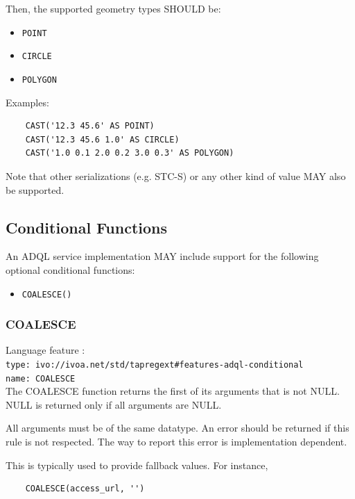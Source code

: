 \documentclass[11pt,a4paper]{ivoa}
\begin{document}
Then, the supported geometry types SHOULD be:

\begin{itemize}
    \item \verb:POINT:
    \item \verb:CIRCLE:
    \item \verb:POLYGON:
\end{itemize}

Examples:

\begin{verbatim}
    CAST('12.3 45.6' AS POINT)
    CAST('12.3 45.6 1.0' AS CIRCLE)
    CAST('1.0 0.1 2.0 0.2 3.0 0.3' AS POLYGON)
\end{verbatim}

Note that other serializations (e.g. STC-S) or any other kind of value MAY also
be supported.

\subsection{Conditional Functions}
\label{sec:condfunc}

An ADQL service implementation MAY include support for the following optional
conditional functions:

\begin{itemize}
    \item \verb:COALESCE():
\end{itemize}

\subsubsection{COALESCE}
{\footnotesize Language feature :}\\
{\footnotesize \verb|type: ivo://ivoa.net/std/tapregext#features-adql-conditional|}\\
{\footnotesize \verb|name: COALESCE|}\\

The COALESCE function returns the first of its arguments that is not
NULL. NULL is returned only if all arguments are NULL.

All arguments must be of the same datatype. An error should be returned
if this rule is not respected. The way to report this error is
implementation dependent.

This is typically used to provide fallback values. For instance,

\begin{verbatim}
    COALESCE(access_url, '')
\end{verbatim}
\end{document}
